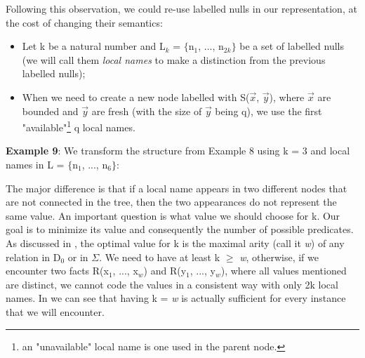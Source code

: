 \documentclass[11pt, a4paper, dvipsnames]{article}
\begin{document}
Following this observation, we could re-use labelled nulls in our representation, at the cost of changing their semantics:
\begin{itemize}
	\item Let k be a natural number and L$_{k}$ = $\{$n$_{1}$, ..., n$_{2k}\}$ be a set of labelled nulls (we will call them \textit{local names} to make a distinction from the previous labelled nulls);
	\item When we need to create a new node labelled with S($\vec{x}$, $\vec{y}$), where $\vec{x}$ are bounded and $\vec{y}$ are fresh (with the size of $\vec{y}$ being q), we use the first "available"\footnote{an "unavailable" local name is one used in the parent node.} q local names. 
\end{itemize} 
\textbf{Example 9}: We transform the structure from Example 8 using k = 3 and local names in L = $\{$n$_{1}$, ..., n$_{6}\}$:
\begin{center}
\end{center}
The major difference is that if a local name appears in two different nodes that are not connected in the tree, then the two appearances do not represent the same value.\newline
An important question is what value we should choose for k. Our goal is to minimize its value and consequently the number of possible predicates. As discussed in \cite{decidable}, the optimal value for k is the maximal arity (call it \textit{w}) of any relation in D$_{0}$ or in $\Sigma$.\newline
We need to have at least k $\geq$ \textit{w}, otherwise, if we encounter two facts R(x$_{1}$, ..., x$_{w}$) and R(y$_{1}$, ..., y$_{w}$), where all values mentioned are distinct, we cannot code the values in a consistent way with only 2k local names. In \cite{decidable} we can see that having k = \textit{w} is actually sufficient for every instance that we will encounter.\newline
\end{document}
